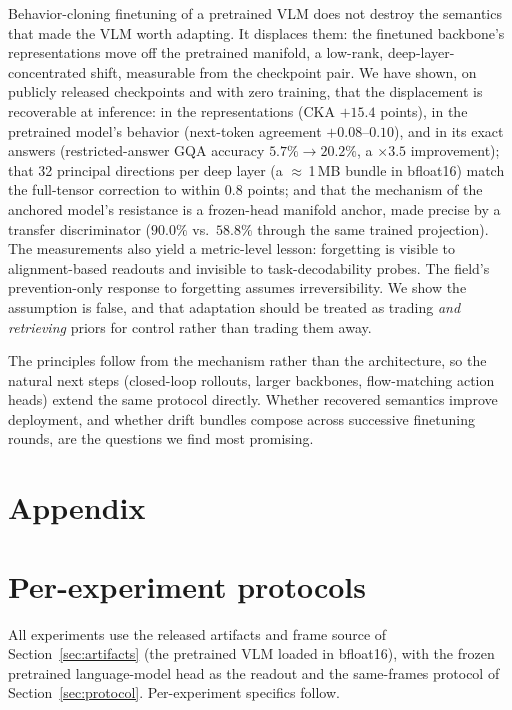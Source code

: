 \documentclass{article}
\begin{document}
Behavior-cloning finetuning of a pretrained VLM does not destroy the semantics that made the
VLM worth adapting. It displaces them: the finetuned backbone's representations move off the
pretrained manifold, a low-rank, deep-layer-concentrated shift, measurable from the
checkpoint pair. We have shown, on publicly released checkpoints and with zero training, that
the displacement is recoverable at inference: in the representations (CKA $+15.4$ points),
in the pretrained model's behavior (next-token agreement $+0.08$--$0.10$), and in its exact
answers (restricted-answer GQA accuracy $5.7\% \rightarrow 20.2\%$, a $\times 3.5$
improvement); that 32 principal directions per deep layer (a $\approx$\,1\,MB bundle in
bfloat16) match the full-tensor correction to within $0.8$ points; and that the mechanism
of the anchored model's resistance is a frozen-head manifold anchor, made precise by a
transfer discriminator ($90.0\%$ vs.\ $58.8\%$ through the same trained projection). The
measurements also yield a metric-level lesson: forgetting is visible to alignment-based
readouts and invisible to task-decodability probes. The field's prevention-only response to
forgetting assumes irreversibility. We show the assumption is false, and that adaptation
should be treated as trading \emph{and retrieving} priors for control rather than trading
them away.

The principles follow from the mechanism rather than the architecture, so the natural next
steps (closed-loop rollouts, larger backbones, flow-matching action heads) extend the
same protocol directly. Whether recovered semantics improve deployment, and whether drift
bundles compose across successive finetuning rounds, are the questions we find most
promising.




\clearpage
\appendix
\section*{Appendix}
\section{Per-experiment protocols}
\label{app:protocols}

All experiments use the released artifacts and frame source of Section~\ref{sec:artifacts}
(the pretrained VLM loaded in bfloat16), with the frozen pretrained language-model head as
the readout and the same-frames protocol of Section~\ref{sec:protocol}. Per-experiment
specifics follow.
\end{document}
